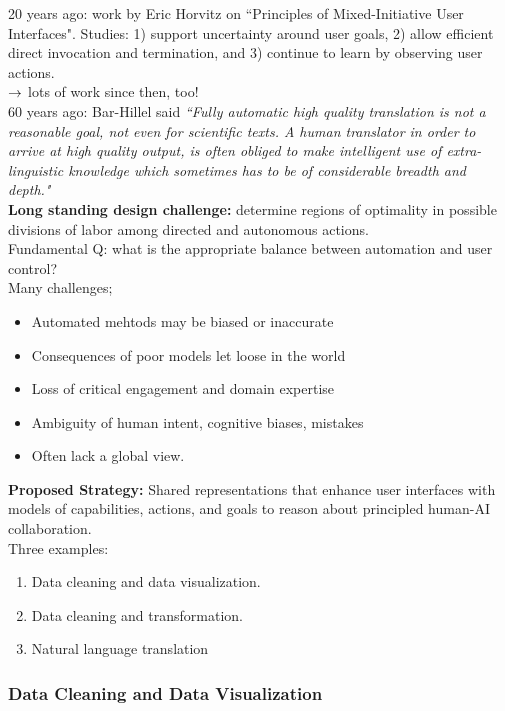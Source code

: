 20 years ago: work by Eric Horvitz on ``Principles of Mixed-Initiative User Interfaces". Studies: 1) support uncertainty around user goals, 2) allow efficient direct invocation and termination, and 3) continue to learn by observing user actions. \\

$\rightarrow$ lots of work since then, too! \\

60 years ago: Bar-Hillel said {\it ``Fully automatic high quality translation is not a reasonable goal, not even for scientific texts. A human translator in order to arrive at high quality output, is often obliged to make intelligent use of extra-linguistic knowledge which sometimes has to be of considerable breadth and depth."} \\

{\bf Long standing design challenge:} determine regions of optimality in possible divisions of labor among directed and autonomous actions. \\

Fundamental Q: what is the appropriate balance between automation and user control? \\

Many challenges;
\begin{itemize}
    \item Automated mehtods may be biased or inaccurate
    \item Consequences of poor models let loose in the world
    \item Loss of critical engagement and domain expertise
    \item Ambiguity of human intent, cognitive biases, mistakes
    \item Often lack a global view.
\end{itemize}

{\bf Proposed Strategy:} Shared representations that enhance user interfaces with models of capabilities, actions, and goals to reason about principled human-AI collaboration. \\

Three examples:
\begin{enumerate}
    \item Data cleaning and data visualization.
    \item Data cleaning and transformation.
    \item Natural language translation
\end{enumerate}

\subsubsection{Data Cleaning and Data Visualization}

